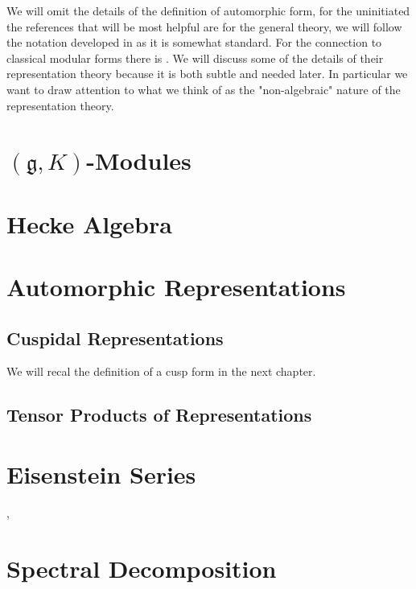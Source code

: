 We will omit the details of the definition of automorphic form, for the uninitiated the references that will be most helpful are \cite[I.II]{borelAutomorphicFormsRepresentations1979}\cite{getzIntroductionAutomorphicRepresentations2024} for the general theory, we will follow the notation developed in \cite{moeglinSpectralDecompositionEisenstein1995} as it is somewhat standard. For the connection to classical modular forms there is \cite{emertonCLASSICALMODULARFORMS}\cite{bumpAutomorphicFormsRepresentations1997}\cite{booherVIEWINGMODULARFORMS}\cite{garrettTransitionEisensteinSeries2016}. We will discuss some of the details of their representation theory because it is both subtle and needed later. In particular we want to draw attention to what we think of as the "non-algebraic" nature of the representation theory.

\section{\((\mathfrak{g}, K)\)-Modules}

\section{Hecke Algebra}

\section{Automorphic Representations}

\subsection{Cuspidal Representations}
We will recal the definition of a cusp form  in the next chapter.

\subsection{Tensor Products of Representations}

\section{Eisenstein Series}
\cite{lapidPerspectivesEisensteinSeries2022}, \cite{arthurEisensteinSeriesTrace1979}

\section{Spectral Decomposition}
